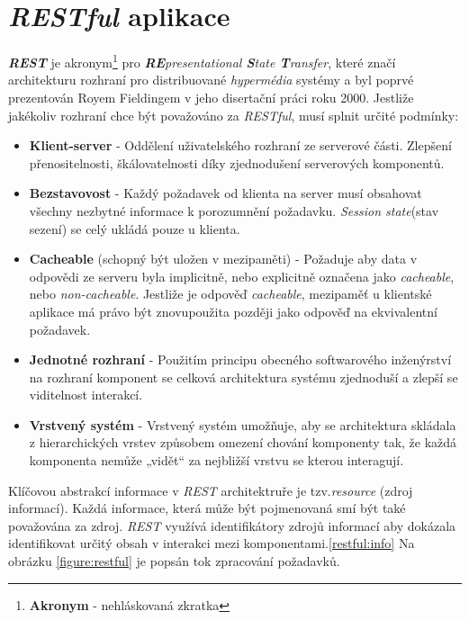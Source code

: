 \section{\emph{RESTful} aplikace}
\label{terminy:restful}
\textbf{\emph{REST}} je akronym\footnote{\textbf{Akronym} - nehláskovaná zkratka} pro \emph{\textbf{RE}presentational \textbf{S}tate \textbf{T}ransfer},
které značí architekturu rozhraní pro distribuované \emph{hypermédia} systémy a byl poprvé prezentován Royem Fieldingem v jeho disertační práci roku 2000.
\newline
\newline
Jestliže jakékoliv rozhraní chce být považováno za \emph{RESTful}, musí splnit určité podmínky:
\begin{itemize}
  \item \textbf{Klient-server} - Oddělení uživatelského rozhraní ze serverové části.
        Zlepšení přenositelnosti, škálovatelnosti díky zjednodušení serverových komponentů.
  \item \textbf{Bezstavovost} - Každý požadavek od klienta na server musí obsahovat všechny nezbytné informace k porozumnění požadavku.
        \emph{Session state}(stav sezení) se celý ukládá pouze u klienta.
  \item \textbf{Cacheable} (schopný být uložen v mezipaměti) - Požaduje aby data v odpovědi ze serveru byla implicitně, nebo explicitně označena jako \emph{cacheable}, nebo \emph{non-cacheable}.
        Jestliže je odpověď \emph{cacheable}, mezipaměť u klientské aplikace má právo být znovupoužita později jako odpověď na ekvivalentní požadavek.
  \item \textbf{Jednotné rozhraní} - Použitím principu obecného softwarového inženýrství na rozhraní komponent se celková architektura systému zjednoduší a zlepší se viditelnost interakcí.
  \item \textbf{Vrstvený systém} - Vrstvený systém umožňuje, aby se architektura skládala z hierarchických vrstev způsobem omezení chování komponenty tak, že každá komponenta nemůže „vidět“ za nejbližší vrstvu se kterou interagují.
\end{itemize}

Klíčovou abstrakcí informace v \emph{REST} architektruře je tzv.\emph{resource} (zdroj informací).
Každá informace, která může být pojmenovaná smí být také považována za zdroj.
\emph{REST} využívá identifikátory zdrojů informací aby dokázala identifikovat určitý obsah v interakci mezi komponentami.\ref{restful:info}
Na obrázku \ref{figure:restful} je popsán tok zpracování požadavků.

